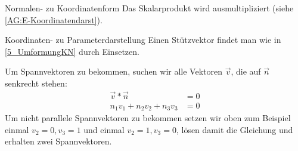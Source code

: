 \begin{bla}{Normalen- zu Koordinatenform}
  Das Skalarprodukt wird ausmultipliziert (siehe \ref{AG:E-Koordinatendarst}).
\end{bla}



\begin{bla}{Koordinaten- zu Parameterdarstellung}
  Einen Stützvektor findet man wie in \ref{5_UmformungKN} durch Einsetzen.

  Um Spannvektoren zu bekommen, suchen wir alle Vektoren $\vec{v}$, die auf $\vec{n}$ senkrecht stehen:
  \begin{align*}
    \vec{v} * \vec{n} &= 0\\
    n_1v_1 + n_2v_2 + n_3v_3 &= 0
  \end{align*}
  Um nicht parallele Spannvektoren zu bekommen setzen wir oben zum Beispiel einmal $v_2 = 0, v_3 = 1$ und einmal $v_2 = 1, v_3 = 0$, lösen damit die Gleichung und erhalten zwei Spannvektoren.
\end{bla}
